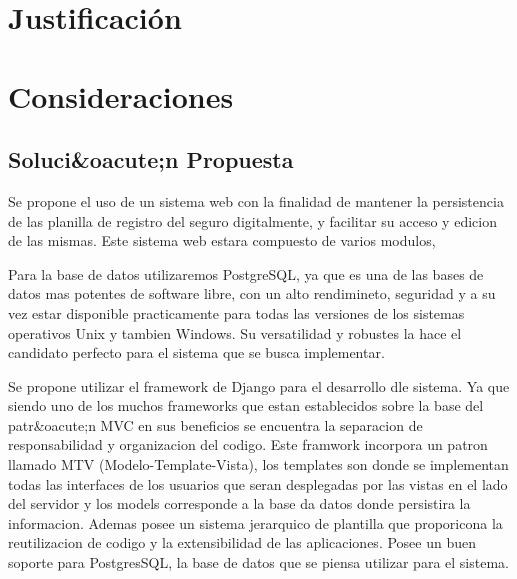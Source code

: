 \section{Justificación}


\section{Consideraciones}


\subsection{Soluci&oacute;n Propuesta}

Se propone el uso de un sistema web con la finalidad de mantener la persistencia de las planilla de registro del seguro digitalmente, y facilitar su acceso y edicion de las mismas. Este sistema web estara compuesto de varios modulos, 

Para la base de datos utilizaremos PostgreSQL, ya que es una de las bases de datos mas potentes de software libre, con un alto rendimineto, seguridad y a su vez estar disponible practicamente para todas las versiones de los sistemas operativos Unix y tambien Windows. Su versatilidad y robustes la hace el candidato perfecto para el sistema que se busca implementar.

Se propone utilizar el framework de Django para el desarrollo dle sistema. Ya que siendo uno de los muchos frameworks que estan establecidos sobre la base del patr&oacute;n MVC en sus beneficios se encuentra la separacion de responsabilidad y organizacion del codigo. Este framwork incorpora un patron llamado MTV (Modelo-Template-Vista), los templates son donde se implementan todas las interfaces de los usuarios que seran desplegadas por las vistas en el lado del servidor y los models corresponde a la base da datos donde persistira la informacion. Ademas posee un sistema jerarquico de plantilla que proporicona la reutilizacion de codigo y la extensibilidad de las aplicaciones. Posee un buen soporte para PostgresSQL, la base de datos que se piensa utilizar para el sistema. 


